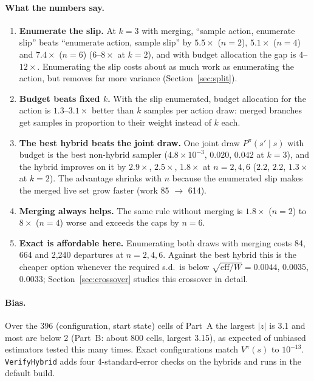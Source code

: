\documentclass[11pt]{article}
\newcommand{\code}[1]{\texttt{#1}}
\begin{document}
\paragraph{What the numbers say.}
\begin{enumerate}
\item \textbf{Enumerate the slip.} At $k=3$ with merging, ``sample action, enumerate slip'' beats ``enumerate action,
  sample slip'' by $5.5\times$ ($n=2$), $5.1\times$ ($n=4$) and $7.4\times$ ($n=6$) ($6$--$8\times$ at $k=2$), and with
  budget allocation the gap is $4$--$12\times$. Enumerating the slip costs about as much work as enumerating the action,
  but removes far more variance (Section~\ref{sec:split}).
\item \textbf{Budget beats fixed $k$.} With the slip enumerated, budget allocation for the action is $1.3$--$3.1\times$
  better than $k$ samples per action draw: merged branches get samples in proportion to their weight instead of $k$
  each.
\item \textbf{The best hybrid beats the joint draw.} One joint draw $P^\pi(s'\mid s)$ with budget is the best
  non-hybrid sampler ($4.8\times10^{-3}$, $0.020$, $0.042$ at $k=3$), and the hybrid improves on it by $2.9\times$,
  $2.5\times$, $1.8\times$ at $n=2,4,6$ ($2.2$, $2.2$, $1.3\times$ at $k=2$). The advantage shrinks with $n$ because the
  enumerated slip makes the merged live set grow faster (work 85 $\to$ 614).
\item \textbf{Merging always helps.} The same rule without merging is $1.8\times$ ($n=2$) to $8\times$ ($n=4$) worse and
  exceeds the caps by $n=6$.
\item \textbf{Exact is affordable here.} Enumerating both draws with merging costs 84, 664 and 2{,}240 departures at
  $n=2,4,6$. Against the best hybrid this is the cheaper option whenever the required s.d.\ is below
  $\sqrt{\text{eff}/W}=0.0044$, $0.0035$, $0.0033$; Section~\ref{sec:crossover} studies this crossover in detail.
\end{enumerate}

\begin{table}[htbp]
\centering\footnotesize

\caption{Detail at $k=3$, $B=9$ with safe merging (rollouts: no merging), averaged over 6 start states.
max $|z|$: largest $|\text{mean}-\text{exact}|/\text{s.e.}$ over the start states.}
\label{tab:detail}
\end{table}

\paragraph{Bias.} Over the 396 (configuration, start state) cells of Part~A the largest $|z|$ is 3.1 and most are below
2 (Part~B: about 800 cells, largest 3.15), as expected of unbiased estimators tested this many times. Exact configurations match $V^\pi(s)$ to $10^{-13}$.
\code{VerifyHybrid} adds four 4-standard-error checks on the hybrids and runs in the default build.
\end{document}
